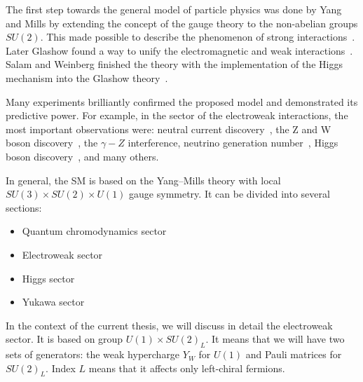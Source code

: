 \documentclass[../main.tex]{subfiles}
\begin{document}
The first step towards the general model of particle physics was done by Yang and Mills by extending the concept of the gauge theory to the non-abelian groups $SU(2)$. This made possible to describe the phenomenon of strong interactions~\cite{Yang1954}. Later Glashow found a way to unify the electromagnetic and weak interactions~\cite{Glashow1961}. Salam and Weinberg finished the theory with the implementation of the Higgs mechanism into the Glashow theory~\cite{Weinberg1967}.

Many experiments brilliantly confirmed the proposed model and demonstrated its predictive power. For example, in the sector of the electroweak interactions, the most important observations were: neutral current discovery~\cite{Cundy1974}, the Z and W boson discovery~\cite{Arnison1983}, the $\gamma-Z$ interference, neutrino generation number~\cite{Arnison1983}, Higgs boson discovery~\cite{Aad2012}, and many others.



In general, the SM is based on the Yang--Mills theory with local $SU(3)\times SU(2)\times U(1)$ gauge symmetry. It can be divided into several sections:
\begin{itemize}
  \item Quantum chromodynamics sector
  \item Electroweak sector
  \item Higgs sector
  \item Yukawa sector
\end{itemize}

In the context of the current thesis, we will discuss in detail the electroweak sector. It is based on group $U(1)\times SU(2)_L$. It means that we will have two sets of generators: the weak hypercharge $Y_W$ for $U(1)$ and Pauli matrices for $SU(2)_L$. Index $L$ means that it affects only left-chiral fermions.
\end{document}

